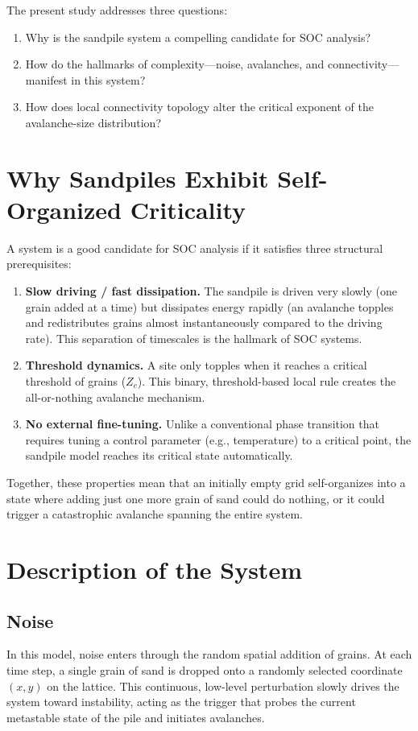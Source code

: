 \documentclass[11pt, a4paper]{article}
\begin{document}
The present study addresses three questions:
\begin{enumerate}
    \item Why is the sandpile system a compelling candidate for SOC analysis?
    \item How do the hallmarks of complexity—noise, avalanches, and connectivity—manifest in this system?
    \item How does local connectivity topology alter the critical exponent of the avalanche-size distribution?
\end{enumerate}

\section{Why Sandpiles Exhibit Self-Organized Criticality}
A system is a good candidate for SOC analysis if it satisfies three structural prerequisites:

\begin{enumerate}
    \item \textbf{Slow driving / fast dissipation.} The sandpile is driven very slowly (one grain added at a time) but dissipates energy rapidly (an avalanche topples and redistributes grains almost instantaneously compared to the driving rate). This separation of timescales is the hallmark of SOC systems.
    \item \textbf{Threshold dynamics.} A site only topples when it reaches a critical threshold of grains ($Z_c$). This binary, threshold-based local rule creates the all-or-nothing avalanche mechanism.
    \item \textbf{No external fine-tuning.} Unlike a conventional phase transition that requires tuning a control parameter (e.g., temperature) to a critical point, the sandpile model reaches its critical state automatically. 
\end{enumerate}

Together, these properties mean that an initially empty grid self-organizes into a state where adding just one more grain of sand could do nothing, or it could trigger a catastrophic avalanche spanning the entire system.

\section{Description of the System}

\subsection{Noise}
In this model, noise enters through the random spatial addition of grains. At each time step, a single grain of sand is dropped onto a randomly selected coordinate $(x, y)$ on the lattice. This continuous, low-level perturbation slowly drives the system toward instability, acting as the trigger that probes the current metastable state of the pile and initiates avalanches.
\end{document}
